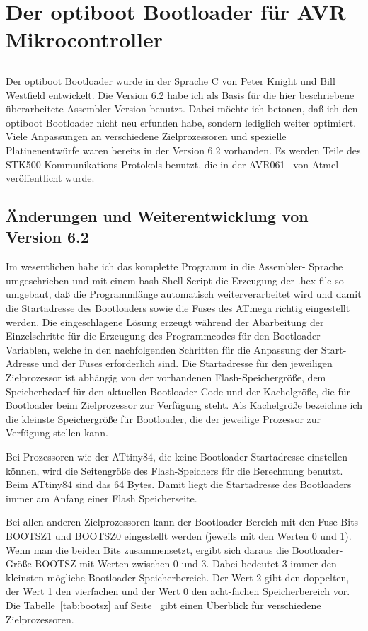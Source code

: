 \chapter{Der optiboot Bootloader für AVR Mikrocontroller}

\section*{}
Der optiboot Bootloader wurde in der Sprache C von Peter Knight und
Bill Westfield entwickelt. Die Version 6.2 habe ich als Basis
für die hier beschriebene überarbeitete Assembler Version benutzt.
Dabei möchte ich betonen, daß ich den optiboot Bootloader nicht
neu erfunden habe, sondern lediglich weiter optimiert. 
Viele Anpassungen an verschiedene Zielprozessoren und spezielle
Platinenentwürfe waren bereits in der Version 6.2 vorhanden.
Es werden Teile des STK500 Kommunikations-Protokols benutzt,
die in der AVR061~\cite{stk500} von Atmel veröffentlicht wurde.


\section{Änderungen und Weiterentwicklung von Version 6.2}
Im wesentlichen habe ich das komplette Programm in die Assembler-
Sprache umgeschrieben und mit einem bash Shell Script die Erzeugung
der .hex file so umgebaut, daß die Programmlänge
automatisch weiterverarbeitet wird und damit die Startadresse
des Bootloaders sowie die Fuses des ATmega richtig eingestellt werden.
Die eingeschlagene Lösung erzeugt während der Abarbeitung der Einzelschritte
für die Erzeugung des Programmcodes für den Bootloader Variablen,
welche in den nachfolgenden Schritten für die Anpassung
der Start-Adresse und der Fuses erforderlich sind.
Die Startadresse für den jeweiligen Zielprozessor ist abhängig von
der vorhandenen Flash-Speichergröße,
dem Speicherbedarf für den aktuellen Bootloader-Code und
der Kachelgröße, die für Bootloader beim Zielprozessor zur Verfügung steht.
Als Kachelgröße bezeichne ich die kleinste Speichergröße für Bootloader,
die der jeweilige Prozessor zur Verfügung stellen kann.


Bei Prozessoren wie der ATtiny84, die keine Bootloader Startadresse einstellen können,
wird die Seitengröße des Flash-Speichers für die Berechnung benutzt.
Beim ATtiny84 sind das 64 Bytes. Damit liegt die Startadresse des Bootloaders immer
am Anfang einer Flash Speicherseite. 

Bei allen anderen Zielprozessoren kann der Bootloader-Bereich mit den
Fuse-Bits BOOTSZ1 und BOOTSZ0 eingestellt werden (jeweils mit den Werten 0 und 1).
Wenn man die beiden Bits zusammensetzt, ergibt sich daraus die
Bootloader-Größe BOOTSZ mit Werten zwischen 0 und 3.
Dabei bedeutet 3 immer den kleinsten mögliche Bootloader Speicherbereich.
Der Wert 2 gibt den doppelten, der Wert 1 den vierfachen und
der Wert 0 den acht-fachen Speicherbereich vor.
Die Tabelle~\ref{tab:bootsz} auf Seite~\pageref{tab:bootsz} gibt einen
Überblick für verschiedene Zielprozessoren.

